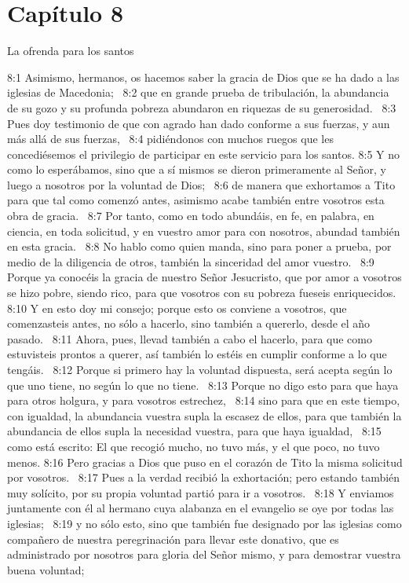 \section*{Capítulo 8}
La ofrenda para los santos  

8:1 Asimismo, hermanos, os hacemos saber la gracia de Dios que se ha dado a las iglesias de Macedonia;  
8:2 que en grande prueba de tribulación, la abundancia de su gozo y su profunda pobreza abundaron en riquezas de su generosidad.  
8:3 Pues doy testimonio de que con agrado han dado conforme a sus fuerzas, y aun más allá de sus fuerzas,  
8:4 pidiéndonos con muchos ruegos que les concediésemos el privilegio de participar en este servicio para los santos. 
8:5 Y no como lo esperábamos, sino que a sí mismos se dieron primeramente al Señor, y luego a nosotros por la voluntad de Dios;  
8:6 de manera que exhortamos a Tito para que tal como comenzó antes, asimismo acabe también entre vosotros esta obra de gracia.  
8:7 Por tanto, como en todo abundáis, en fe, en palabra, en ciencia, en toda solicitud, y en vuestro amor para con nosotros, abundad también en esta gracia.  
8:8 No hablo como quien manda, sino para poner a prueba, por medio de la diligencia de otros, también la sinceridad del amor vuestro.  
8:9 Porque ya conocéis la gracia de nuestro Señor Jesucristo, que por amor a vosotros se hizo pobre, siendo rico, para que vosotros con su pobreza fueseis enriquecidos.  
8:10 Y en esto doy mi consejo; porque esto os conviene a vosotros, que comenzasteis antes, no sólo a hacerlo, sino también a quererlo, desde el año pasado.  
8:11 Ahora, pues, llevad también a cabo el hacerlo, para que como estuvisteis prontos a querer, así también lo estéis en cumplir conforme a lo que tengáis.  
8:12 Porque si primero hay la voluntad dispuesta, será acepta según lo que uno tiene, no según lo que no tiene.  
8:13 Porque no digo esto para que haya para otros holgura, y para vosotros estrechez,  
8:14 sino para que en este tiempo, con igualdad, la abundancia vuestra supla la escasez de ellos, para que también la abundancia de ellos supla la necesidad vuestra, para que haya igualdad,  
8:15 como está escrito: El que recogió mucho, no tuvo más, y el que poco, no tuvo menos. 
8:16 Pero gracias a Dios que puso en el corazón de Tito la misma solicitud por vosotros.  
8:17 Pues a la verdad recibió la exhortación; pero estando también muy solícito, por su propia voluntad partió para ir a vosotros.  
8:18 Y enviamos juntamente con él al hermano cuya alabanza en el evangelio se oye por todas las iglesias;  
8:19 y no sólo esto, sino que también fue designado por las iglesias como compañero de nuestra peregrinación para llevar este donativo, que es administrado por nosotros para gloria del Señor mismo, y para demostrar vuestra buena voluntad;  

